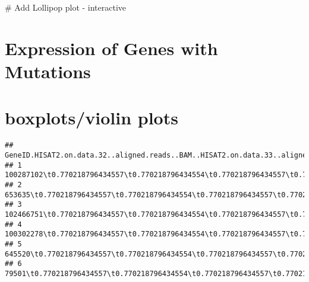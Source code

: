 \documentclass[
]{article}
\newenvironment{Shaded}{\begin{snugshade}}{\end{snugshade}}
\newcommand{\CommentTok}[1]{\textcolor[rgb]{0.48,0.49,0.49}{#1}}
\begin{document}
\begin{Shaded}
\begin{Highlighting}[]
\CommentTok{\# Add Lollipop plot {-} interactive}
\end{Highlighting}
\end{Shaded}

\hypertarget{expression-of-genes-with-mutations}{%
\section{Expression of Genes with
Mutations}\label{expression-of-genes-with-mutations}}

\hypertarget{boxplotsviolin-plots}{%
\section{boxplots/violin plots}\label{boxplotsviolin-plots}}

\begin{verbatim}
##   GeneID.HISAT2.on.data.32..aligned.reads..BAM..HISAT2.on.data.33..aligned.reads..BAM..HISAT2.on.data.34..aligned.reads..BAM..HISAT2.on.data.29..aligned.reads..BAM..HISAT2.on.data.30..aligned.reads..BAM..HISAT2.on.data.31..aligned.reads..BAM.
## 1                                                                                                                      100287102\t0.770218796434557\t0.770218796434554\t0.770218796434557\t0.770218796434557\t0.770218796434557\t0.770218796434557
## 2                                                                                                                         653635\t0.770218796434557\t0.770218796434554\t0.770218796434557\t0.770218796434557\t0.770218796434557\t0.770218796434557
## 3                                                                                                                      102466751\t0.770218796434557\t0.770218796434554\t0.770218796434557\t0.770218796434557\t0.770218796434557\t0.770218796434557
## 4                                                                                                                      100302278\t0.770218796434557\t0.770218796434554\t0.770218796434557\t0.770218796434557\t0.770218796434557\t0.770218796434557
## 5                                                                                                                         645520\t0.770218796434557\t0.770218796434554\t0.770218796434557\t0.770218796434557\t0.770218796434557\t0.770218796434557
## 6                                                                                                                          79501\t0.770218796434557\t0.770218796434554\t0.770218796434557\t0.770218796434557\t0.770218796434557\t0.770218796434557
\end{verbatim}
\end{document}
